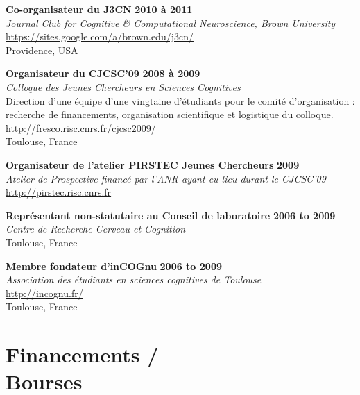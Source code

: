 \documentclass[margin,line]{resume}
\begin{document}
\begin{resume}
\newpage


	\vspace{-2mm} 
	\textbf{Co-organisateur du J3CN} \hfill \textbf{2010 à 2011}\\
	\textsl{Journal Club for Cognitive \& Computational Neuroscience, Brown University}\\
	 \url{https://sites.google.com/a/brown.edu/j3cn/}\\
	Providence, USA	

	\vspace{-2mm} 
	\textbf{Organisateur du CJCSC'09} \hfill \textbf{2008 à 2009}\\
	\textsl{Colloque des Jeunes Chercheurs en Sciences Cognitives}\\
	Direction d'une équipe d'une vingtaine d'étudiants pour le comité d'organisation : recherche de financements, organisation scientifique et logistique du colloque.\\
	 \url{http://fresco.risc.cnrs.fr/cjcsc2009/}\\
	Toulouse, France	

	\vspace{-2mm} 
	\textbf{Organisateur de l'atelier PIRSTEC Jeunes Chercheurs} \hfill \textbf{2009}\\
	\textsl{Atelier de Prospective financé par l'ANR ayant eu lieu durant le CJCSC'09}\\
	\url{http://pirstec.risc.cnrs.fr}

	\vspace{-2mm} 
	\textbf{Représentant non-statutaire au Conseil de laboratoire} \hfill \textbf{2006 to 2009}\\
	\textsl{Centre de Recherche Cerveau et Cognition}\\
	Toulouse, France	

	\vspace{-2mm} 
	\textbf{Membre fondateur d'inCOGnu} \hfill \textbf{2006 to 2009}\\
	\textsl{Association des étudiants en sciences cognitives de Toulouse}\\
	 \url{http://incognu.fr/}\\
	Toulouse, France	


\vspace{3mm}
    \section{\mysidestyle Financements /\\Bourses}


\end{resume}
\end{document}
